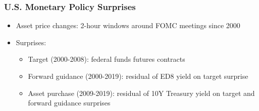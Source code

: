 \documentclass[12pt, aspectratio=169, xcolor=dvipsnames]{beamer}  %
\begin{document}
%


\begin{frame}
\frametitle{U.S. Monetary Policy Surprises}
\begin{itemize}
	\item Asset price changes: 2-hour windows around FOMC meetings since 2000
	\item Surprises: \cite*{Kuttner:2001,GSS:2005a}
	\begin{itemize}
		\item Target (2000-2008): federal funds futures contracts
		\item Forward guidance (2000-2019): residual of ED8 yield on target surprise
		\item Asset purchase (2009-2019): residual of 10Y Treasury yield on target and forward guidance surprises
	\end{itemize}
\end{itemize}
\end{frame}
\end{document}
